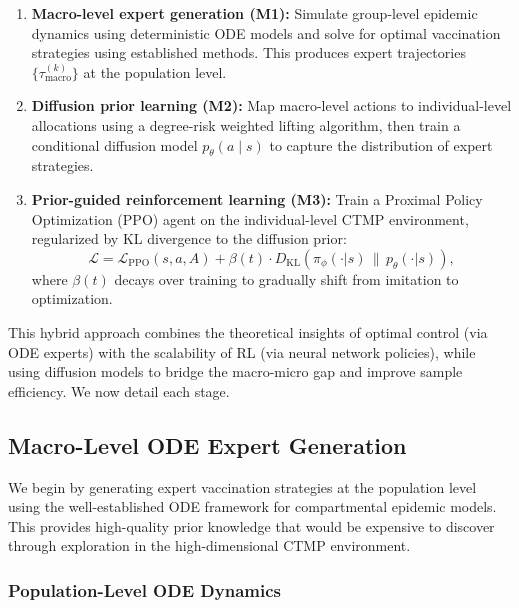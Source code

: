 \begin{enumerate}
    \item \textbf{Macro-level expert generation (M1):} Simulate group-level epidemic
    dynamics using deterministic ODE models and solve for optimal vaccination strategies
    using established methods. This produces expert trajectories $\{\tau_{\text{macro}}^{(k)}\}$
    at the population level.

    \item \textbf{Diffusion prior learning (M2):} Map macro-level actions to individual-level
    allocations using a degree-risk weighted lifting algorithm, then train a conditional
    diffusion model $p_\theta(a \mid s)$ to capture the distribution of expert strategies.

    \item \textbf{Prior-guided reinforcement learning (M3):} Train a Proximal Policy
    Optimization (PPO) agent on the individual-level CTMP environment, regularized by
    KL divergence to the diffusion prior:
    \begin{equation}
    \mathcal{L} = \mathcal{L}_{\text{PPO}}(s,a,A) + \beta(t) \cdot D_{\text{KL}}(\pi_\phi(\cdot|s) \,\|\, p_\theta(\cdot|s)),
    \label{eq:prior_guided_loss}
    \end{equation}
    where $\beta(t)$ decays over training to gradually shift from imitation to optimization.
\end{enumerate}

This hybrid approach combines the theoretical insights of optimal control (via ODE
experts) with the scalability of RL (via neural network policies), while using diffusion
models to bridge the macro-micro gap and improve sample efficiency. We now detail each
stage.


\subsection{Macro-Level ODE Expert Generation}
\label{sec:ode_expert}

We begin by generating expert vaccination strategies at the population level using
the well-established ODE framework for compartmental epidemic models. This provides
high-quality prior knowledge that would be expensive to discover through exploration
in the high-dimensional CTMP environment.

\subsubsection{Population-Level ODE Dynamics}

